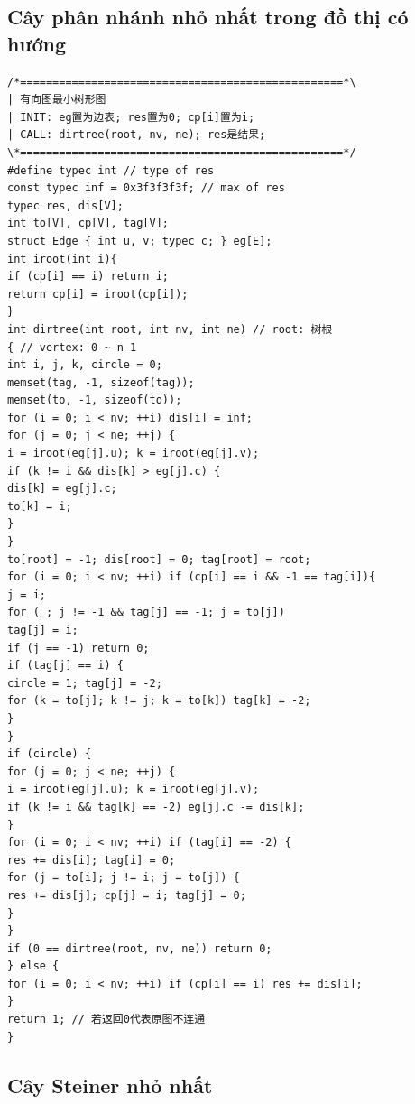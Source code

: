 \documentclass[11pt]{article}
\begin{document}
\subsection{Cây phân nhánh nhỏ nhất trong đồ thị có hướng}

\begingroup
\scriptsize
\begin{verbatim}
/*==================================================*\
| 有向图最小树形图
| INIT: eg置为边表; res置为0; cp[i]置为i;
| CALL: dirtree(root, nv, ne); res是结果;
\*==================================================*/
#define typec int // type of res
const typec inf = 0x3f3f3f3f; // max of res
typec res, dis[V];
int to[V], cp[V], tag[V];
struct Edge { int u, v; typec c; } eg[E];
int iroot(int i){
if (cp[i] == i) return i;
return cp[i] = iroot(cp[i]);
}
int dirtree(int root, int nv, int ne) // root: 树根
{ // vertex: 0 ~ n-1
int i, j, k, circle = 0;
memset(tag, -1, sizeof(tag));
memset(to, -1, sizeof(to));
for (i = 0; i < nv; ++i) dis[i] = inf;
for (j = 0; j < ne; ++j) {
i = iroot(eg[j].u); k = iroot(eg[j].v);
if (k != i && dis[k] > eg[j].c) {
dis[k] = eg[j].c;
to[k] = i;
}
}
to[root] = -1; dis[root] = 0; tag[root] = root;
for (i = 0; i < nv; ++i) if (cp[i] == i && -1 == tag[i]){
j = i;
for ( ; j != -1 && tag[j] == -1; j = to[j])
tag[j] = i;
if (j == -1) return 0;
if (tag[j] == i) {
circle = 1; tag[j] = -2;
for (k = to[j]; k != j; k = to[k]) tag[k] = -2;
}
}
if (circle) {
for (j = 0; j < ne; ++j) {
i = iroot(eg[j].u); k = iroot(eg[j].v);
if (k != i && tag[k] == -2) eg[j].c -= dis[k];
}
for (i = 0; i < nv; ++i) if (tag[i] == -2) {
res += dis[i]; tag[i] = 0;
for (j = to[i]; j != i; j = to[j]) {
res += dis[j]; cp[j] = i; tag[j] = 0;
}
}
if (0 == dirtree(root, nv, ne)) return 0;
} else {
for (i = 0; i < nv; ++i) if (cp[i] == i) res += dis[i];
}
return 1; // 若返回0代表原图不连通
}
\end{verbatim}
\endgroup

\subsection{Cây Steiner nhỏ nhất}
\end{document}

